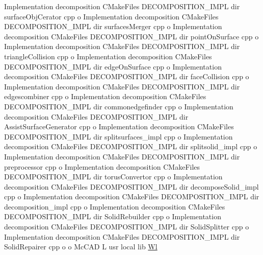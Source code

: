 \begin{DoxyCompactItemize}
Implementation decomposition C\+Make\+Files D\+E\+C\+O\+M\+P\+O\+S\+I\+T\+I\+O\+N\+\_\+\+I\+M\+PL dir surface\+Obj\+Cerator cpp o Implementation decomposition C\+Make\+Files D\+E\+C\+O\+M\+P\+O\+S\+I\+T\+I\+O\+N\+\_\+\+I\+M\+PL dir surfaces\+Merger cpp o Implementation decomposition C\+Make\+Files D\+E\+C\+O\+M\+P\+O\+S\+I\+T\+I\+O\+N\+\_\+\+I\+M\+PL dir point\+On\+Surface cpp o Implementation decomposition C\+Make\+Files D\+E\+C\+O\+M\+P\+O\+S\+I\+T\+I\+O\+N\+\_\+\+I\+M\+PL dir triangle\+Collision cpp o Implementation decomposition C\+Make\+Files D\+E\+C\+O\+M\+P\+O\+S\+I\+T\+I\+O\+N\+\_\+\+I\+M\+PL dir edge\+On\+Surface cpp o Implementation decomposition C\+Make\+Files D\+E\+C\+O\+M\+P\+O\+S\+I\+T\+I\+O\+N\+\_\+\+I\+M\+PL dir face\+Collision cpp o Implementation decomposition C\+Make\+Files D\+E\+C\+O\+M\+P\+O\+S\+I\+T\+I\+O\+N\+\_\+\+I\+M\+PL dir edgescombiner cpp o Implementation decomposition C\+Make\+Files D\+E\+C\+O\+M\+P\+O\+S\+I\+T\+I\+O\+N\+\_\+\+I\+M\+PL dir commonedgefinder cpp o Implementation decomposition C\+Make\+Files D\+E\+C\+O\+M\+P\+O\+S\+I\+T\+I\+O\+N\+\_\+\+I\+M\+PL dir Assist\+Surface\+Generator cpp o Implementation decomposition C\+Make\+Files D\+E\+C\+O\+M\+P\+O\+S\+I\+T\+I\+O\+N\+\_\+\+I\+M\+PL dir splitsurfaces\+\_\+impl cpp o Implementation decomposition C\+Make\+Files D\+E\+C\+O\+M\+P\+O\+S\+I\+T\+I\+O\+N\+\_\+\+I\+M\+PL dir splitsolid\+\_\+impl cpp o Implementation decomposition C\+Make\+Files D\+E\+C\+O\+M\+P\+O\+S\+I\+T\+I\+O\+N\+\_\+\+I\+M\+PL dir preprocessor cpp o Implementation decomposition C\+Make\+Files D\+E\+C\+O\+M\+P\+O\+S\+I\+T\+I\+O\+N\+\_\+\+I\+M\+PL dir torus\+Convertor cpp o Implementation decomposition C\+Make\+Files D\+E\+C\+O\+M\+P\+O\+S\+I\+T\+I\+O\+N\+\_\+\+I\+M\+PL dir decompose\+Solid\+\_\+impl cpp o Implementation decomposition C\+Make\+Files D\+E\+C\+O\+M\+P\+O\+S\+I\+T\+I\+O\+N\+\_\+\+I\+M\+PL dir decomposition\+\_\+impl cpp o Implementation decomposition C\+Make\+Files D\+E\+C\+O\+M\+P\+O\+S\+I\+T\+I\+O\+N\+\_\+\+I\+M\+PL dir Solid\+Rebuilder cpp o Implementation decomposition C\+Make\+Files D\+E\+C\+O\+M\+P\+O\+S\+I\+T\+I\+O\+N\+\_\+\+I\+M\+PL dir Solid\+Splitter cpp o Implementation decomposition C\+Make\+Files D\+E\+C\+O\+M\+P\+O\+S\+I\+T\+I\+O\+N\+\_\+\+I\+M\+PL dir Solid\+Repairer cpp o o Mc\+C\+AD L usr local lib \hyperlink{link_8txt_a8685673d17df1ca70720fe6a7fda61c6}{Wl}
\item 

\end{DoxyCompactItemize}
